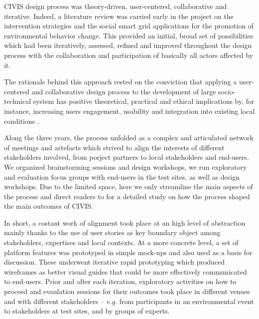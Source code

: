 CIVIS design process was theory-driven, user-centered, collaborative and iterative. Indeed, a
literature review was carried early in the project on the intervention strategies and the social smart
grid applications for the promotion of environmental behavior change. This provided an initial, broad set
of possibilities which had been iteratively, assessed, refined and improved throughout the design process with
the collaboration and participation of basically all actors affected by it.

The rationale behind this approach rested on the conviction that applying a user-centered and
collaborative design process to the development of large socio-technical system has positive
theoretical, practical and ethical implications \cite{Greenbaum1993,Boedker2004} by, for instance, increasing users engagement,
usability and integration into existing local conditions \cite{Brynjarsdottir2012,Dick2012,Pierce2012}.

Along the three years, the process unfolded as a complex and articulated network of meetings and artefacts
which strived to align the interests of different stakeholders involved, from porject partners to
local stakeholders and end-users. We organized brainstorming sessions and design workshops, we run
exploratory and evaluation focus groups with end-users in the test sites, as well as design workshops.
Due to the limited space, here we only streamline the main aspects of the process and direct readers to
\cite{poderi_disentangling_2017} for a detailed study on how the process shaped the main
outcomes of CIVIS. %

In short, a costant work of alignment took place at an high level of abstraction mainly thanks to
the use of user stories as key boundary object among stakeholders,
expertises and local contexts. At a more concrete level, a set of platform features was prototyped in simple mock-ups
and also used as a basis for discussion. These underwent iterative rapid prototyping which
produced wireframes as better visual guides that could be more effectively communicated to end-users.
Prior and after each iteration, exploratory activities on how to proceed and evaulation sessions for their outcomes
took place in different venues and with different stakeholders -- \textit{e.g.} from participants in
an environmental event \cite{Barssi2015} to stakeholders at test sites, and by groups of experts.


